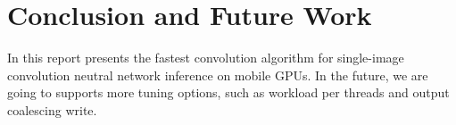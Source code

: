 \documentclass{article}
\begin{document}
\section{Conclusion and Future Work}

In this report presents the fastest convolution algorithm for single-image convolution neutral network inference on mobile GPUs. In the future, we are going to supports more tuning options, such as workload per threads and output coalescing write.





  










\end{document}
